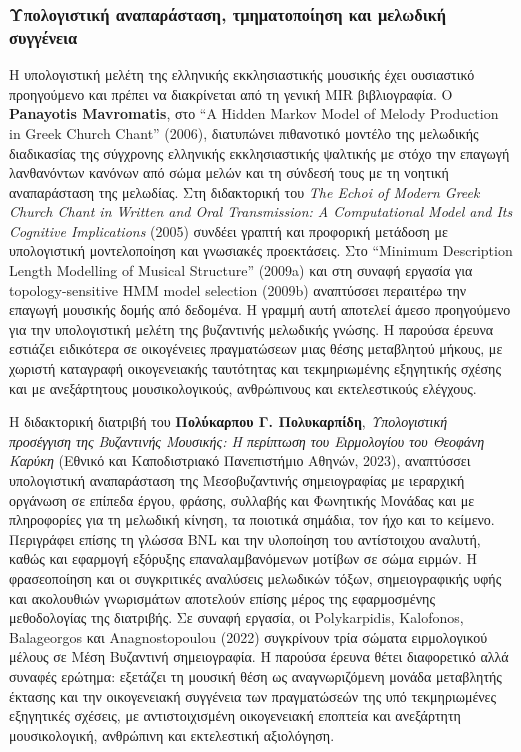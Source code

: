 \documentclass[11pt,a4paper]{article}
\begin{document}
\subsubsection{Υπολογιστική αναπαράσταση, τμηματοποίηση και μελωδική συγγένεια}

Η υπολογιστική μελέτη της ελληνικής εκκλησιαστικής μουσικής έχει ουσιαστικό προηγούμενο και πρέπει να διακρίνεται από τη γενική MIR βιβλιογραφία. Ο \textbf{Panayotis Mavromatis}, στο ``A Hidden Markov Model of Melody Production in Greek Church Chant'' (2006), διατυπώνει πιθανοτικό μοντέλο της μελωδικής διαδικασίας της σύγχρονης ελληνικής εκκλησιαστικής ψαλτικής με στόχο την επαγωγή λανθανόντων κανόνων από σώμα μελών και τη σύνδεσή τους με τη νοητική αναπαράσταση της μελωδίας. Στη διδακτορική του \emph{The Echoi of Modern Greek Church Chant in Written and Oral Transmission: A Computational Model and Its Cognitive Implications} (2005) συνδέει γραπτή και προφορική μετάδοση με υπολογιστική μοντελοποίηση και γνωσιακές προεκτάσεις. Στο ``Minimum Description Length Modelling of Musical Structure'' (2009a) και στη συναφή εργασία για topology-sensitive HMM model selection (2009b) αναπτύσσει περαιτέρω την επαγωγή μουσικής δομής από δεδομένα. Η γραμμή αυτή αποτελεί άμεσο προηγούμενο για την υπολογιστική μελέτη της βυζαντινής μελωδικής γνώσης. Η παρούσα έρευνα εστιάζει ειδικότερα σε οικογένειες πραγματώσεων μιας θέσης μεταβλητού μήκους, με χωριστή καταγραφή οικογενειακής ταυτότητας και τεκμηριωμένης εξηγητικής σχέσης και με ανεξάρτητους μουσικολογικούς, ανθρώπινους και εκτελεστικούς ελέγχους.

Η διδακτορική διατριβή του \textbf{Πολύκαρπου Γ. Πολυκαρπίδη}, \emph{Υπολογιστική προσέγγιση της Βυζαντινής Μουσικής: Η περίπτωση του Ειρμολογίου του Θεοφάνη Καρύκη} (Εθνικό και Καποδιστριακό Πανεπιστήμιο Αθηνών, 2023), αναπτύσσει υπολογιστική αναπαράσταση της Μεσοβυζαντινής σημειογραφίας με ιεραρχική οργάνωση σε επίπεδα έργου, φράσης, συλλαβής και Φωνητικής Μονάδας και με πληροφορίες για τη μελωδική κίνηση, τα ποιοτικά σημάδια, τον ήχο και το κείμενο. Περιγράφει επίσης τη γλώσσα BNL και την υλοποίηση του αντίστοιχου αναλυτή, καθώς και εφαρμογή εξόρυξης επαναλαμβανόμενων μοτίβων σε σώμα ειρμών. Η φρασεοποίηση και οι συγκριτικές αναλύσεις μελωδικών τόξων, σημειογραφικής υφής και ακολουθιών γνωρισμάτων αποτελούν επίσης μέρος της εφαρμοσμένης μεθοδολογίας της διατριβής. Σε συναφή εργασία, οι Polykarpidis, Kalofonos, Balageorgos και Anagnostopoulou (2022) συγκρίνουν τρία σώματα ειρμολογικού μέλους σε Μέση Βυζαντινή σημειογραφία. Η παρούσα έρευνα θέτει διαφορετικό αλλά συναφές ερώτημα: εξετάζει τη μουσική θέση ως αναγνωριζόμενη μονάδα μεταβλητής έκτασης και την οικογενειακή συγγένεια των πραγματώσεών της υπό τεκμηριωμένες εξηγητικές σχέσεις, με αντιστοιχισμένη οικογενειακή εποπτεία και ανεξάρτητη μουσικολογική, ανθρώπινη και εκτελεστική αξιολόγηση.
\end{document}
